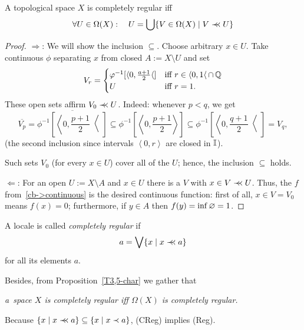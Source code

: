 \begin{prop} \label{T3,5-char}
  A topological space $X$ is completely regular iff
  \[
    \forall U\in \Omega(X): \quad U = \bigcup\{V\in \Omega(X) \mid V \prec\mkern-8mu\prec U\}
  \]
\end{prop}
\begin{proof}
  $\Rightarrow$:
  We will show the inclusion $\subseteq$. 
  Choose arbitrary $x\in U$.
  Take continuous $\phi$ separating $x$ from closed $A := X\setminus U$ and set
  \[
  V_r =
  \begin{cases}
    \varphi^{-1}[\langle 0, \frac{a+1}{2} \langle] &\mbox{iff } r\in \langle 0, 1
    \langle \, \cap \, \mathbb{Q}  \\
    U                                   &\mbox{iff } r = 1.
  \end{cases}
  \]
  These open sets affirm $V_0 \prec\mkern-8mu\prec U$.
  Indeed: 
  whenever $p < q$, we get
  \[
    \overline{V_p}
    = \overline{\phi^{-1}\left[ \left\langle 0, \frac{p+1}{2} \right\langle \right]}
    \subseteq \phi^{-1}\left[ \left\langle 0, \frac{p+1}{2} \right\rangle \right]
    \subseteq \phi^{-1}\left[ \left\langle 0, \frac{q+1}{2} \right\langle \right]
    = V_q,
  \]
  (the second inclusion since intervals $\left\langle 0, r \right\rangle$ are
  closed in $\mathbb{I}$).

  Such sets $V_0$ (for every $x\in U$) cover all of the $U$; hence, the
  inclusion $\subseteq$ holds.

  $\Leftarrow$:
  For an open $U := X\setminus A$ and $x\in U$ there is a $V$ with $x\in V \prec\mkern-8mu\prec U$.
  Thus, the $f$ from~\ref{cb->continuous} is the desired continuous function:
  first of all, $x\in V = V_0$ means $f(x) = 0$;
  furthermore, if $y\in A$ then $f(y) = \inf \varnothing = 1$.
\end{proof}

\begin{framed}
  \begin{df}[CReg]
    A locale is called \emph{completely regular\/} if
    \[
      a = \bigvee \{x \mid x \prec\mkern-8mu\prec a\}
    \]
    for all its elements $a$.
  \end{df}
\end{framed}

Besides, from Proposition~\ref{T3,5-char} we gather that
\begin{center}
  \emph{a~space $X$ is completely regular iff $\Omega(X)$ is completely
  regular.\/}
\end{center}

\begin{rem}
  Because $\{x \mid x \prec\mkern-8mu\prec a\}\subseteq \{x \mid x \prec a\}$, (CReg) implies (Reg).
\end{rem}
